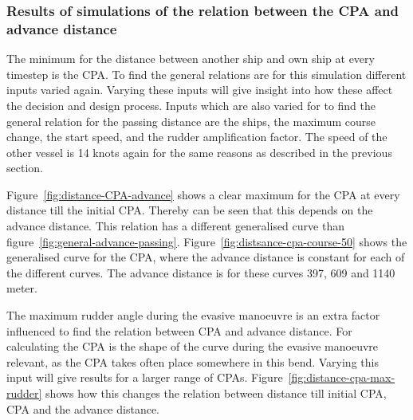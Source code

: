 \subsubsection{Results of simulations of the relation between the CPA and advance distance}
The minimum for the distance between another ship and own ship at every timestep is the \ac{CPA}. To find the general relations are for this simulation different inputs varied again. Varying these inputs will give insight into how these affect the decision and design process.
Inputs which are also varied for to find the general relation for the passing distance are the ships, the maximum course change, the start speed, and the rudder amplification factor. The speed of the other vessel is 14 knots again for the same reasons as described in the previous section.

Figure~\ref{fig:distance-CPA-advance} shows a clear maximum for the CPA at every distance till the initial CPA. Thereby can be seen that this depends on the advance distance. This relation has a different generalised curve than figure~\ref{fig:general-advance-passing}. Figure~\ref{fig:distsance-cpa-course-50} shows the generalised curve for the CPA, where the advance distance is constant for each of the different curves. The advance distance is for these curves 397, 609 and 1140 meter.

The maximum rudder angle during the evasive manoeuvre is an extra factor influenced to find the relation between CPA and advance distance. For calculating the CPA is the shape of the curve during the evasive manoeuvre relevant, as the CPA takes often place somewhere in this bend. Varying this input will give results for a larger range of CPAs. Figure~\ref{fig:distance-cpa-max-rudder} shows how this changes the relation between distance till initial CPA, CPA and the advance distance.

